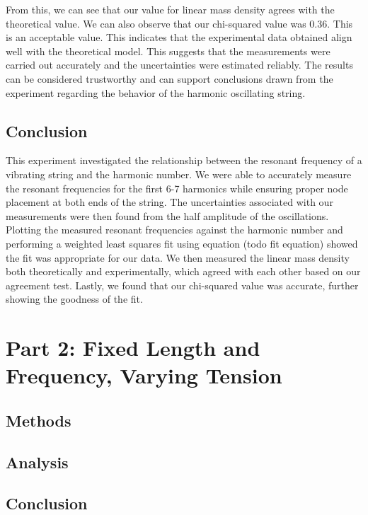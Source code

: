 \documentclass[11pt]{article}
\let\oldsection\section
\renewcommand\section{\clearpage\oldsection}
\begin{document}
    From this, we can see that our value for linear mass density agrees with the theoretical value. We can also observe that our chi-squared value was 0.36. This is an acceptable value. This indicates that the experimental data obtained align well with the theoretical model. This suggests that the measurements were carried out accurately and the uncertainties were estimated reliably. The results can be considered trustworthy and can support conclusions drawn from the experiment regarding the behavior of the harmonic oscillating string. 


    
    \subsection{Conclusion}\label{subsec:part_1_conclusion}
    This experiment investigated the relationship between the resonant frequency of a vibrating string and the harmonic number. We were able to accurately measure the resonant frequencies for the first 6-7 harmonics while ensuring proper node placement at both ends of the string. The uncertainties associated with our measurements were then found from the half amplitude of the oscillations. Plotting the measured resonant frequencies against the harmonic number and performing a weighted least squares fit using equation (todo fit equation) showed the fit was appropriate for our data. We then measured the linear mass density both theoretically and experimentally, which agreed with each other based on our agreement test. Lastly, we found that our chi-squared value was accurate, further showing the goodness of the fit.

    
    \section{Part 2: Fixed Length and Frequency, Varying Tension }\label{sec:part_2}
    \subsection{Methods}\label{subsec:part_2_methods}
    \subsection{Analysis}\label{subsec:part_2_analysis}
    \subsection{Conclusion}\label{subsec:part_2_conclusion}
\end{document}
